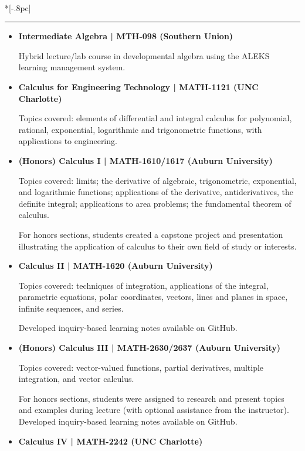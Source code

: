 \documentclass{article}
\newcommand{\headerText}[1]{
  \noindent{\large \bf #1} \\*[-.8pc]
  \rule{\textwidth}{.1pt}}
\begin{document}
\headerText{Teaching}
\begin{itemize}
  \item
    \textbf{Intermediate Algebra | MTH-098 (Southern Union)}

    Hybrid lecture/lab course in
    developmental algebra using the ALEKS learning management system.

  \item
    \textbf{Calculus for Engineering Technology | MATH-1121 (UNC Charlotte)}

    Topics covered: elements of differential and integral calculus for
    polynomial, rational, exponential, logarithmic and trigonometric
    functions, with applications to engineering.

  \item
    \textbf{(Honors) Calculus I | MATH-1610/1617 (Auburn University)}

    Topics covered: limits; the derivative of algebraic, trigonometric,
    exponential, and logarithmic functions; applications of the derivative,
    antiderivatives, the definite integral; applications to area problems;
    the fundamental theorem of calculus.

    For honors sections, students
    created a capstone project and presentation illustrating the application
    of calculus to their own field of study or interests.

  \item
    \textbf{Calculus II | MATH-1620 (Auburn University)}

    Topics covered: techniques of integration, applications of the integral,
    parametric equations, polar coordinates, vectors, lines and planes in space,
    infinite sequences, and series.

    Developed inquiry-based learning notes available on GitHub.

  \item
    \textbf{(Honors) Calculus III | MATH-2630/2637 (Auburn University)}

    Topics covered: vector-valued functions, partial derivatives,
    multiple integration, and vector calculus.

    For honors sections, students were assigned to research and present
    topics and examples during lecture (with optional assistance from the
    instructor).
    Developed inquiry-based learning notes available on GitHub.

  \item
    \textbf{Calculus IV | MATH-2242 (UNC Charlotte)}


\end{itemize}
\end{document}
